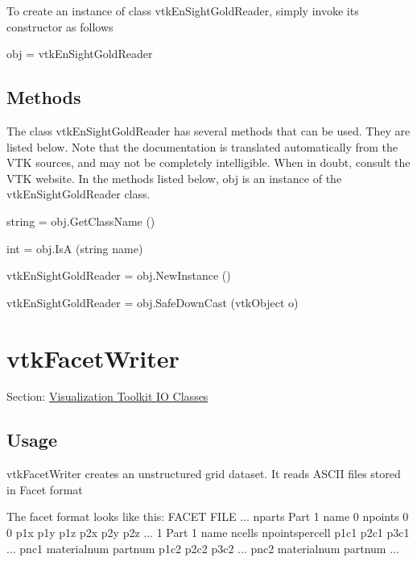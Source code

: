 To create an instance of class vtk\-En\-Sight\-Gold\-Reader, simply invoke its constructor as follows \begin{DoxyVerb}  obj = vtkEnSightGoldReader
\end{DoxyVerb}
 \hypertarget{vtkwidgets_vtkxyplotwidget_Methods}{}\subsection{Methods}\label{vtkwidgets_vtkxyplotwidget_Methods}
The class vtk\-En\-Sight\-Gold\-Reader has several methods that can be used. They are listed below. Note that the documentation is translated automatically from the V\-T\-K sources, and may not be completely intelligible. When in doubt, consult the V\-T\-K website. In the methods listed below, {\ttfamily obj} is an instance of the vtk\-En\-Sight\-Gold\-Reader class. 
\begin{DoxyItemize}
\item {\ttfamily string = obj.\-Get\-Class\-Name ()}  
\item {\ttfamily int = obj.\-Is\-A (string name)}  
\item {\ttfamily vtk\-En\-Sight\-Gold\-Reader = obj.\-New\-Instance ()}  
\item {\ttfamily vtk\-En\-Sight\-Gold\-Reader = obj.\-Safe\-Down\-Cast (vtk\-Object o)}  
\end{DoxyItemize}\hypertarget{vtkio_vtkfacetwriter}{}\section{vtk\-Facet\-Writer}\label{vtkio_vtkfacetwriter}
Section\-: \hyperlink{sec_vtkio}{Visualization Toolkit I\-O Classes} \hypertarget{vtkwidgets_vtkxyplotwidget_Usage}{}\subsection{Usage}\label{vtkwidgets_vtkxyplotwidget_Usage}
vtk\-Facet\-Writer creates an unstructured grid dataset. It reads A\-S\-C\-I\-I files stored in Facet format

The facet format looks like this\-: F\-A\-C\-E\-T F\-I\-L\-E ... nparts Part 1 name 0 npoints 0 0 p1x p1y p1z p2x p2y p2z ... 1 Part 1 name ncells npointspercell p1c1 p2c1 p3c1 ... pnc1 materialnum partnum p1c2 p2c2 p3c2 ... pnc2 materialnum partnum ...

